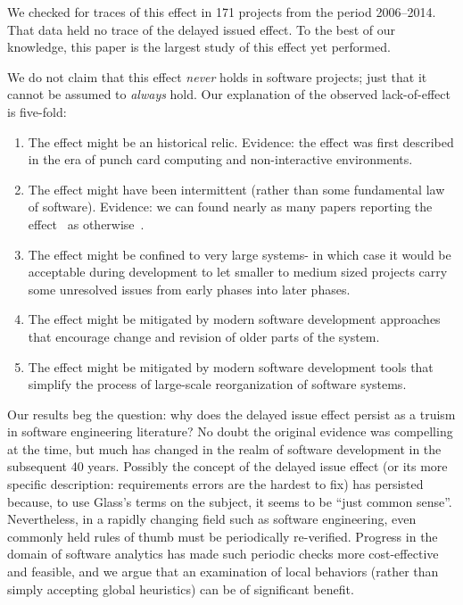 \documentclass[smallcondensed]{svjour3}
\newcommand{\be}{\begin{enumerate}}
\newcommand{\ee}{\end{enumerate}}
\begin{document}
We checked for traces of this effect in 171 projects from the period 2006--2014.
That data held no trace of the delayed issued effect.
To the best of our knowledge, this paper is the  largest study
of this effect yet performed.

 


We do not claim that this effect {\em never} holds in software projects; just that it cannot be assumed to {\em always} hold. Our explanation of the observed lack-of-effect is five-fold:
\be
\item The effect might be an historical relic. Evidence:
the effect was first described in the era of punch card computing and non-interactive environments.
\item The effect might have been intermittent (rather than some fundamental law of software). Evidence: we can  found nearly
as many papers reporting the effect~\cite{Boehm76,Boehm81,steck04,Fagan76,Stephenson76} as otherwise~\cite{Royce98,Boehm80,Shull02}.
\item The effect might be confined to very large systems- in which case it would be
acceptable during development to let smaller to medium
sized projects carry some unresolved issues from early phases into later phases.
\item The effect might be mitigated by modern software development approaches that
encourage change and revision of older parts of the system.
\item The effect might be mitigated by modern software development tools
that simplify the process of large-scale reorganization of software systems.
\ee
  
Our results beg the question: why does the delayed issue effect persist as a truism in software engineering literature? No doubt the original evidence was compelling at the time, but much has changed in the realm of software development in the subsequent 40 years. Possibly the concept of the delayed issue effect (or its more specific description: requirements errors are the hardest to fix)
has persisted because, to use Glass's terms on the subject, it seems to be ``just common sense''\cite{glass02}. 
Nevertheless, in a rapidly changing field such as software engineering, even commonly held rules of thumb must be periodically re-verified. 
Progress in the domain of software analytics has made such periodic checks more cost-effective and feasible, and we argue that an examination of local behaviors (rather than simply accepting global heuristics) can be of significant benefit.
\end{document}
